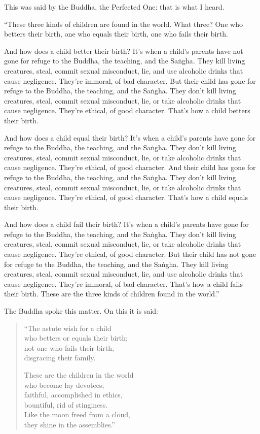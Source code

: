 \documentclass[12pt,openany]{book}%
\begin{document}
This was said by the Buddha, the Perfected One: that is what I heard. 

“These three kinds of children are found in the world. What three? One who betters their birth, one who equals their birth, one who fails their birth. 

And how does a child better their birth? It’s when a child’s parents have not gone for refuge to the Buddha, the teaching, and the \textsanskrit{Saṅgha}. They kill living creatures, steal, commit sexual misconduct, lie, and use alcoholic drinks that cause negligence. They’re immoral, of bad character. But their child has gone for refuge to the Buddha, the teaching, and the \textsanskrit{Saṅgha}. They don’t kill living creatures, steal, commit sexual misconduct, lie, or take alcoholic drinks that cause negligence. They’re ethical, of good character. That’s how a child betters their birth. 

And how does a child equal their birth? It’s when a child’s parents have gone for refuge to the Buddha, the teaching, and the \textsanskrit{Saṅgha}. They don’t kill living creatures, steal, commit sexual misconduct, lie, or take alcoholic drinks that cause negligence. They’re ethical, of good character. And their child has gone for refuge to the Buddha, the teaching, and the \textsanskrit{Saṅgha}. They don’t kill living creatures, steal, commit sexual misconduct, lie, or take alcoholic drinks that cause negligence. They’re ethical, of good character. That’s how a child equals their birth. 

And how does a child fail their birth? It’s when a child’s parents have gone for refuge to the Buddha, the teaching, and the \textsanskrit{Saṅgha}. They don’t kill living creatures, steal, commit sexual misconduct, lie, or take alcoholic drinks that cause negligence. They’re ethical, of good character. But their child has not gone for refuge to the Buddha, the teaching, and the \textsanskrit{Saṅgha}. They kill living creatures, steal, commit sexual misconduct, lie, and use alcoholic drinks that cause negligence. They’re immoral, of bad character. That’s how a child fails their birth. These are the three kinds of children found in the world.” 

The Buddha spoke this matter. On this it is said: 

\begin{verse}%
“The astute wish for a child \\
who betters or equals their birth; \\
not one who fails their birth, \\
disgracing their family. 

These are the children in the world \\
who become lay devotees; \\
faithful, accomplished in ethics, \\
bountiful, rid of stinginess. \\
Like the moon freed from a cloud, \\
they shine in the assemblies.” 

%
\end{verse}
\end{document}
